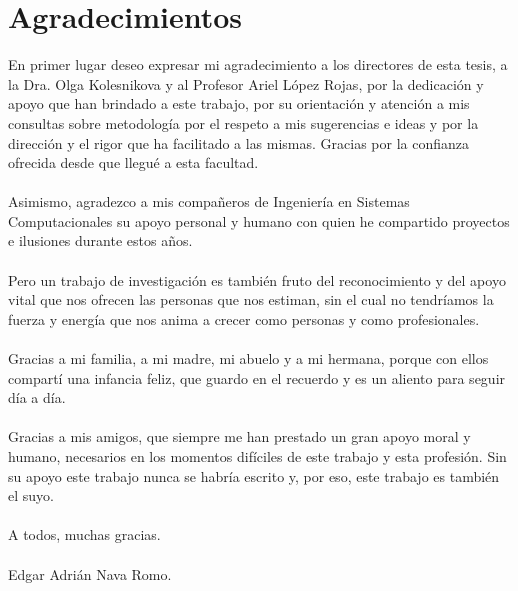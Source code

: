 \documentclass[12pt, a4paper, titlepage]{report}
\begin{document}
\section*{Agradecimientos}
En primer lugar deseo expresar mi agradecimiento a los directores de esta tesis, a la Dra. Olga Kolesnikova
y al Profesor Ariel López Rojas, por la dedicación y apoyo que han brindado a este trabajo, por su orientación y atención a mis consultas sobre metodología por el respeto a mis sugerencias e ideas y por la dirección y el rigor que ha facilitado a las mismas. Gracias por la confianza ofrecida desde que llegué a esta facultad.\\\\
Asimismo, agradezco a mis compañeros de Ingeniería en Sistemas Computacionales su apoyo
personal y humano con quien he compartido proyectos e ilusiones durante estos años.\\\\
Pero un trabajo de investigación es también fruto del reconocimiento y del apoyo vital
que nos ofrecen las personas que nos estiman, sin el cual no tendríamos la fuerza y
energía que nos anima a crecer como personas y como profesionales.\\\\
Gracias a mi familia, a mi madre, mi abuelo y a mi hermana, porque con ellos compartí una
infancia feliz, que guardo en el recuerdo y es un aliento para seguir día a día.\\\\
Gracias a mis amigos, que siempre me han prestado un gran apoyo moral y humano,
necesarios en los momentos difíciles de este trabajo y esta profesión.
Sin su apoyo este trabajo nunca se habría escrito y, por eso, este
trabajo es también el suyo.\\\\

A todos, muchas gracias.\\\\

Edgar Adrián Nava Romo.
\end{document}
